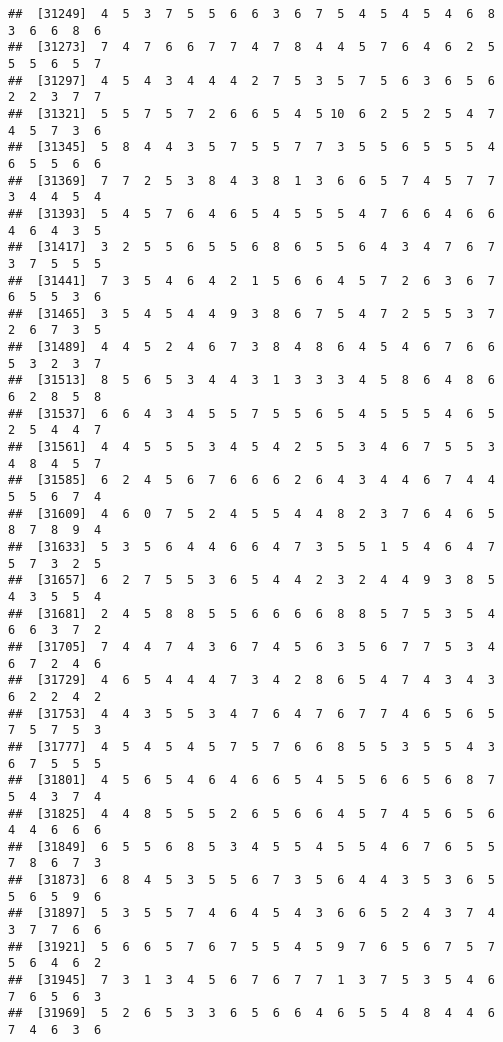 \documentclass[
]{book}
\begin{document}
\begin{verbatim}
##  [31249]  4  5  3  7  5  5  6  6  3  6  7  5  4  5  4  5  4  6  8  3  6  6  8  6
##  [31273]  7  4  7  6  6  7  7  4  7  8  4  4  5  7  6  4  6  2  5  5  5  6  5  7
##  [31297]  4  5  4  3  4  4  4  2  7  5  3  5  7  5  6  3  6  5  6  2  2  3  7  7
##  [31321]  5  5  7  5  7  2  6  6  5  4  5 10  6  2  5  2  5  4  7  4  5  7  3  6
##  [31345]  5  8  4  4  3  5  7  5  5  7  7  3  5  5  6  5  5  5  4  6  5  5  6  6
##  [31369]  7  7  2  5  3  8  4  3  8  1  3  6  6  5  7  4  5  7  7  3  4  4  5  4
##  [31393]  5  4  5  7  6  4  6  5  4  5  5  5  4  7  6  6  4  6  6  4  6  4  3  5
##  [31417]  3  2  5  5  6  5  5  6  8  6  5  5  6  4  3  4  7  6  7  3  7  5  5  5
##  [31441]  7  3  5  4  6  4  2  1  5  6  6  4  5  7  2  6  3  6  7  6  5  5  3  6
##  [31465]  3  5  4  5  4  4  9  3  8  6  7  5  4  7  2  5  5  3  7  2  6  7  3  5
##  [31489]  4  4  5  2  4  6  7  3  8  4  8  6  4  5  4  6  7  6  6  5  3  2  3  7
##  [31513]  8  5  6  5  3  4  4  3  1  3  3  3  4  5  8  6  4  8  6  6  2  8  5  8
##  [31537]  6  6  4  3  4  5  5  7  5  5  6  5  4  5  5  5  4  6  5  2  5  4  4  7
##  [31561]  4  4  5  5  5  3  4  5  4  2  5  5  3  4  6  7  5  5  3  4  8  4  5  7
##  [31585]  6  2  4  5  6  7  6  6  6  2  6  4  3  4  4  6  7  4  4  5  5  6  7  4
##  [31609]  4  6  0  7  5  2  4  5  5  4  4  8  2  3  7  6  4  6  5  8  7  8  9  4
##  [31633]  5  3  5  6  4  4  6  6  4  7  3  5  5  1  5  4  6  4  7  5  7  3  2  5
##  [31657]  6  2  7  5  5  3  6  5  4  4  2  3  2  4  4  9  3  8  5  4  3  5  5  4
##  [31681]  2  4  5  8  8  5  5  6  6  6  6  8  8  5  7  5  3  5  4  6  6  3  7  2
##  [31705]  7  4  4  7  4  3  6  7  4  5  6  3  5  6  7  7  5  3  4  6  7  2  4  6
##  [31729]  4  6  5  4  4  4  7  3  4  2  8  6  5  4  7  4  3  4  3  6  2  2  4  2
##  [31753]  4  4  3  5  5  3  4  7  6  4  7  6  7  7  4  6  5  6  5  7  5  7  5  3
##  [31777]  4  5  4  5  4  5  7  5  7  6  6  8  5  5  3  5  5  4  3  6  7  5  5  5
##  [31801]  4  5  6  5  4  6  4  6  6  5  4  5  5  6  6  5  6  8  7  5  4  3  7  4
##  [31825]  4  4  8  5  5  5  2  6  5  6  6  4  5  7  4  5  6  5  6  4  4  6  6  6
##  [31849]  6  5  5  6  8  5  3  4  5  5  4  5  5  4  6  7  6  5  5  7  8  6  7  3
##  [31873]  6  8  4  5  3  5  5  6  7  3  5  6  4  4  3  5  3  6  5  5  6  5  9  6
##  [31897]  5  3  5  5  7  4  6  4  5  4  3  6  6  5  2  4  3  7  4  3  7  7  6  6
##  [31921]  5  6  6  5  7  6  7  5  5  4  5  9  7  6  5  6  7  5  7  5  6  4  6  2
##  [31945]  7  3  1  3  4  5  6  7  6  7  7  1  3  7  5  3  5  4  6  7  6  5  6  3
##  [31969]  5  2  6  5  3  3  6  5  6  6  4  6  5  5  4  8  4  4  6  7  4  6  3  6

\end{verbatim}
\end{document}
